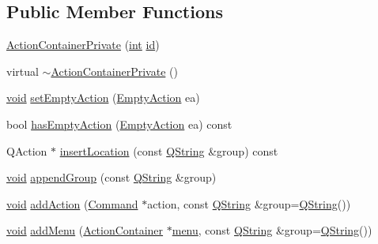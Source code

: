 \subsection*{Public Member Functions}
\begin{DoxyCompactItemize}
\item 
\hyperlink{group___core_plugin_ga52f85042d81d941ff4ac9b051f397eeb}{Action\-Container\-Private} (\hyperlink{ioapi_8h_a787fa3cf048117ba7123753c1e74fcd6}{int} \hyperlink{glext_8h_a58c2a664503e14ffb8f21012aabff3e9}{id})
\item 
virtual \hyperlink{group___core_plugin_ga34f1b550ba50b544b5a9b8c55ab7d9d1}{$\sim$\-Action\-Container\-Private} ()
\item 
\hyperlink{group___u_a_v_objects_plugin_ga444cf2ff3f0ecbe028adce838d373f5c}{void} \hyperlink{group___core_plugin_gaa38318117b2644daea6897b102055a8f}{set\-Empty\-Action} (\hyperlink{group___core_plugin_ga25957afb898f645827d8e7949c831327}{Empty\-Action} ea)
\item 
bool \hyperlink{group___core_plugin_ga16fba98ce7f8879392e66d2091e2b67e}{has\-Empty\-Action} (\hyperlink{group___core_plugin_ga25957afb898f645827d8e7949c831327}{Empty\-Action} ea) const 
\item 
Q\-Action $\ast$ \hyperlink{group___core_plugin_ga7f3d7f6e914a516890183d6135161cec}{insert\-Location} (const \hyperlink{group___u_a_v_objects_plugin_gab9d252f49c333c94a72f97ce3105a32d}{Q\-String} \&group) const 
\item 
\hyperlink{group___u_a_v_objects_plugin_ga444cf2ff3f0ecbe028adce838d373f5c}{void} \hyperlink{group___core_plugin_ga3bc2b8884a63451e9e7bfc1556cb78fd}{append\-Group} (const \hyperlink{group___u_a_v_objects_plugin_gab9d252f49c333c94a72f97ce3105a32d}{Q\-String} \&group)
\item 
\hyperlink{group___u_a_v_objects_plugin_ga444cf2ff3f0ecbe028adce838d373f5c}{void} \hyperlink{group___core_plugin_ga9ca5ea32ad53e24a2086f781e5677f1c}{add\-Action} (\hyperlink{class_core_1_1_command}{Command} $\ast$action, const \hyperlink{group___u_a_v_objects_plugin_gab9d252f49c333c94a72f97ce3105a32d}{Q\-String} \&group=\hyperlink{group___u_a_v_objects_plugin_gab9d252f49c333c94a72f97ce3105a32d}{Q\-String}())
\item 
\hyperlink{group___u_a_v_objects_plugin_ga444cf2ff3f0ecbe028adce838d373f5c}{void} \hyperlink{group___core_plugin_ga90d26d7f9b3ba4fe2e1bf088b861c0e0}{add\-Menu} (\hyperlink{class_core_1_1_action_container}{Action\-Container} $\ast$\hyperlink{group___core_plugin_ga243949a2b2abff30862e34f6313f28c0}{menu}, const \hyperlink{group___u_a_v_objects_plugin_gab9d252f49c333c94a72f97ce3105a32d}{Q\-String} \&group=\hyperlink{group___u_a_v_objects_plugin_gab9d252f49c333c94a72f97ce3105a32d}{Q\-String}())

\end{DoxyCompactItemize}
